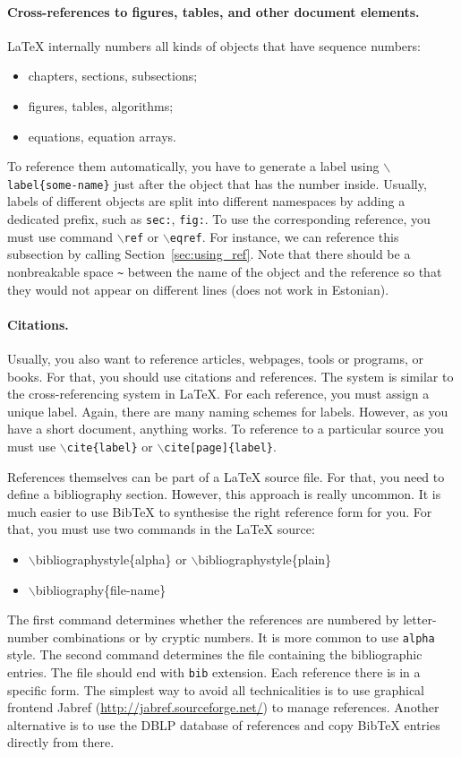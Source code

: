 \documentclass[estonian,english]{unitartucs-thesis} %
\begin{document}
\paragraph{Cross-references to figures, tables, and other document elements.}
LaTeX  internally numbers all kinds of objects that have sequence numbers:
\begin{itemize}
\item chapters, sections, subsections;
\item figures, tables, algorithms;
\item equations, equation arrays.
\end{itemize}
To reference them automatically, you have to generate a label using \texttt{$\backslash$label\{some-name\}} just after the object that has the number inside. Usually, labels of different objects are split into different namespaces by adding a dedicated prefix, such as \texttt{sec:}, \texttt{fig:}. To use the corresponding reference, you must use command \texttt{$\backslash$ref} or \texttt{$\backslash$eqref}. For instance, we can reference this subsection by calling Section~\ref{sec:using_ref}. Note that there should be a nonbreakable space \texttt{\~} between the name of the object and the reference so that they would not appear on different lines (does not work in Estonian).



\paragraph{Citations.}
Usually, you also want to reference articles, webpages, tools or programs, or books. For that, you should use citations and references. The system is similar to the cross-referencing system in LaTeX. For each reference, you must assign a unique label. Again, there are many naming schemes for labels. However, as you have a short document, anything works. To reference to a particular source you must use \texttt{$\backslash$cite\{label\}} or \texttt{$\backslash$cite[page]\{label\}}.

References themselves can be part of a LaTeX source file. For that, you need to define a bibliography section. However, this approach is really uncommon. It is much easier to use BibTeX to synthesise the right reference form for you. For that, you must use two commands in the LaTeX source:
\begin{itemize}
\item $\backslash$bibliographystyle\{alpha\} or $\backslash$bibliographystyle\{plain\}
\item $\backslash$bibliography\{file-name\}
\end{itemize}
The first command determines whether the references are numbered by letter-number combinations or by cryptic numbers. It is more common to use \texttt{alpha} style. The second command determines the file containing the bibliographic entries. The file should end with \texttt{bib} extension. Each reference there is in a specific form. The simplest way to avoid all technicalities is to use graphical frontend  Jabref (\url{http://jabref.sourceforge.net/}) to manage references. Another alternative is to use the DBLP database of references and copy BibTeX entries directly from there.
\end{document}
